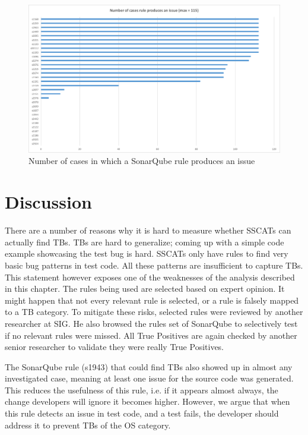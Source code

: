 \documentclass{uvamscse}
\begin{document}
\begin{figure}[!ht]
	\centering
	\includegraphics[width=1\textwidth]{figures/SQIssuesForAllCases.png}
	\caption{Number of cases in which a SonarQube rule produces an issue}
	\label{fig:SQIssuesForAll}
\end{figure}

\section{Discussion}
There are a number of reasons why it is hard to measure whether SSCATs can actually find TBs. TBs are hard to generalize; coming up with a simple code example showcasing the test bug is hard. SSCATs only have rules to find very basic bug patterns in test code. All these patterns are insufficient to capture TBs. This statement however exposes one of the weaknesses of the analysis described in this chapter. The rules being used are selected based on expert opinion. It might happen that not every relevant rule is selected, or a rule is falsely mapped to a TB category. To mitigate these risks, selected rules were reviewed by another researcher at SIG. He also browsed the rules set of SonarQube to selectively test if no relevant rules were missed. All True Positives are again checked by another senior researcher to validate they were really True Positives.  

The SonarQube rule (s1943) that could find TBs also showed up in almost any investigated case, meaning at least one issue for the source code was generated. This reduces the usefulness of this rule, i.e. if it appears almost always, the change developers will ignore it becomes higher. However, we argue that when this rule detects an issue in test code, and a test fails, the developer should address it to prevent TBs of the OS category. 
\end{document}
